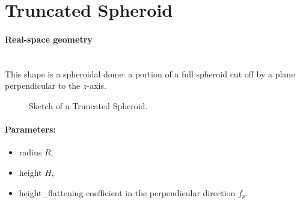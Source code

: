 \newpage
\section{Truncated Spheroid} 

\paragraph{Real-space geometry}\mbox{}\\
This shape is a spheroidal dome: a portion of a full spheroid cut off
by a plane perpendicular to the $z$-axis.

\begin{figure}[ht]
\hfill
{}
\hfill
{}
\hfill
\caption{Sketch of a Truncated Spheroid.}
\label{fig:spheroid}
\end{figure}

\paragraph{Parameters:}
\begin{itemize}
\item radius $R$,
\item height $H$,
\item height\_flattening coefficient in the perpendicular direction $f_p$.
\end{itemize}

